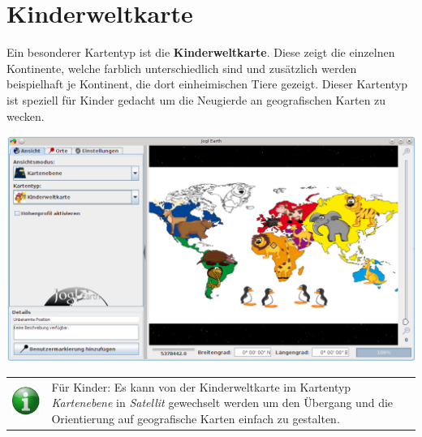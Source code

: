 \documentclass[10pt]{scrreprt}
\newcommand{\textref}[1]{\mbox{\raisebox{0.1ex}{\small$\rightarrow$ }\textit{#1}}}
\begin{document}
\vspace{5mm}
\section{Kinderweltkarte}  
Ein besonderer Kartentyp ist die \textbf{Kinderweltkarte}. Diese zeigt die einzelnen Kontinente, welche farblich unterschiedlich sind und zusätzlich werden beispielhaft je Kontinent, die dort einheimischen Tiere gezeigt. Dieser Kartentyp ist speziell für Kinder gedacht um die Neugierde an geografischen Karten zu wecken.

\vspace{3mm}
\begin{center}
\includegraphics[scale=0.3]{images/flacheKarte_Kinderweltkarte.png}
\end{center}

\vspace{3mm}
\begin{tabular}{>{\centering \arraybackslash}m{1cm} m{14cm}}
\includegraphics[scale=0.5]{images/info.eps} &  Für Kinder: Es kann von der Kinderweltkarte im Kartentyp \textref{Kartenebene} in \textref{Satellit} gewechselt werden um den Übergang und die Orientierung auf geografische Karten einfach zu gestalten.
\end{tabular}



\newpage
\end{document}
